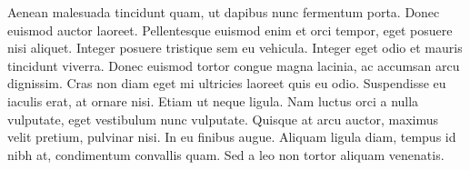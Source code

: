 Aenean malesuada tincidunt quam, ut dapibus nunc fermentum porta. Donec euismod auctor laoreet. Pellentesque euismod enim et orci tempor, eget posuere nisi aliquet. Integer posuere tristique sem eu vehicula. Integer eget odio et mauris tincidunt viverra. Donec euismod tortor congue magna lacinia, ac accumsan arcu dignissim. Cras non diam eget mi ultricies laoreet quis eu odio. Suspendisse eu iaculis erat, at ornare nisi. Etiam ut neque ligula. Nam luctus orci a nulla vulputate, eget vestibulum nunc vulputate. Quisque at arcu auctor, maximus velit pretium, pulvinar nisi. In eu finibus augue. Aliquam ligula diam, tempus id nibh at, condimentum convallis quam. Sed a leo non tortor aliquam venenatis.

